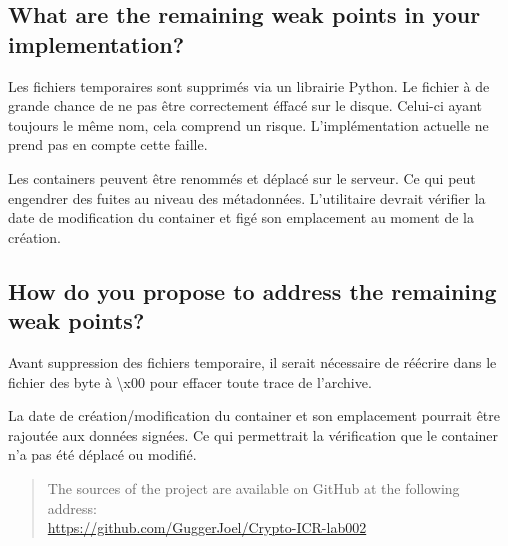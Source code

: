 \documentclass[a4paper]{report}
\begin{document}
\subsection{What are the remaining weak points in your implementation?}
Les fichiers temporaires sont supprimés via un librairie Python. Le fichier à de grande chance de ne pas être correctement éffacé sur le disque. Celui-ci ayant toujours le même nom, cela comprend un risque. L'implémentation actuelle ne prend pas en compte cette faille.

Les containers peuvent être renommés et déplacé sur le serveur. Ce qui peut engendrer des fuites au niveau des métadonnées. L'utilitaire devrait vérifier la date de modification du container et figé son emplacement au moment de la création.

\subsection{How do you propose to address the remaining weak points?}
Avant suppression des fichiers temporaire, il serait nécessaire de réécrire dans le fichier des byte à \textbackslash x00 pour effacer toute trace de l'archive.

La date de création/modification du container et son emplacement pourrait être rajoutée aux données signées. Ce qui permettrait la vérification que le container n'a pas été déplacé ou modifié.


\newpage

\begin{abstract}
\begin{center}
The sources of the project are available on GitHub at the following address: \\
\href{https://github.com/GuggerJoel/Crypto-ICR-lab002}{https://github.com/GuggerJoel/Crypto-ICR-lab002}
\end{center}
\end{abstract}
\end{document}
